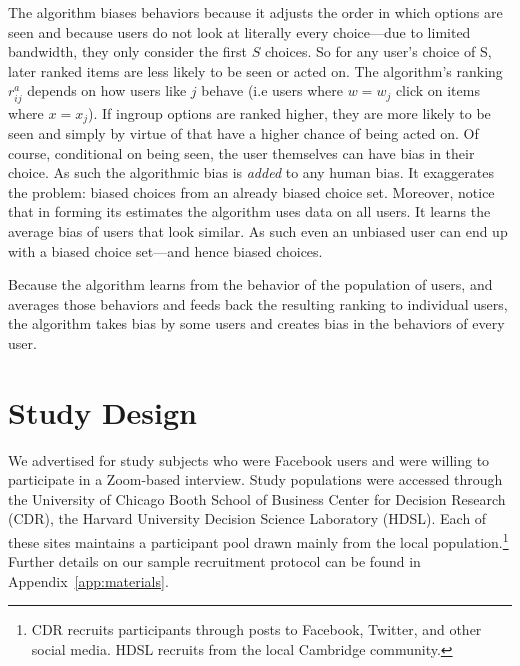 \documentclass[12pt,letterpaper]{article}
\begin{document}
The algorithm biases behaviors because it adjusts the order in which options are seen and because users do not look at literally every choice---due to limited bandwidth, they only consider the first $S$ choices. So for any user's choice of S, later ranked items are less likely to be seen or acted on. The algorithm's ranking $r_{ij}^a$ depends on how users like $j$ behave (i.e users where $w =w_j$ click on items where $x=x_j$). If ingroup options are ranked higher, they are more likely to be seen and simply by virtue of that have a higher chance of being acted on. Of course, conditional on being seen, the user themselves can have bias in their choice. As such the algorithmic bias is {\em added} to any human bias. It exaggerates the problem: biased choices from an already biased choice set. Moreover, notice that in forming its estimates the algorithm uses data on all users. It learns the average bias of users that look similar. As such even an unbiased user can end up with a biased choice set---and hence biased choices. 

Because the algorithm learns from the behavior of the population of users, and averages those behaviors and feeds back the resulting ranking to individual users, the algorithm takes bias by some users and creates bias in the behaviors of every user.


\section{Study Design} 

We advertised for study subjects who were Facebook users and were willing to participate in a Zoom-based interview. Study populations were accessed through the University of Chicago Booth School of Business Center for Decision Research (CDR), the Harvard University Decision Science Laboratory (HDSL).  Each of these sites maintains a participant pool drawn mainly from the local population.\footnote{CDR recruits participants through posts to Facebook, Twitter, and other social media. HDSL recruits from the local Cambridge community.} Further details on our sample recruitment protocol can be found in Appendix~\ref{app:materials}.
\end{document}
